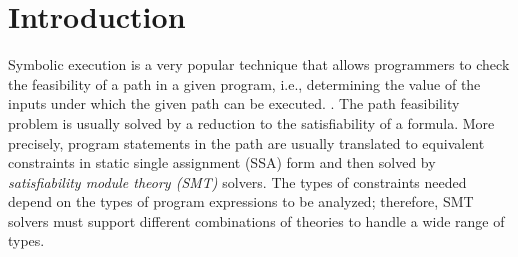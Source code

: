 \documentclass[sigplan,review,anonymous]{acmart}\settopmatter{printfolios=true,printccs=false,printacmref=false}
\begin{document}
\newcommand{\st}[2]{q_{#1}^{#2}}
\newcommand{\sym}[2]{v_{#1}^{#2}}

\maketitle






\section{Introduction} \label{section:introduction}

Symbolic execution is a very popular technique that allows programmers to check the feasibility of a path in a given program, i.e., determining the value of the inputs under which the given path can be executed. \cite{????}.
The path feasibility problem is usually solved by a reduction to the satisfiability of a formula. More precisely, program statements in the path are usually translated to equivalent constraints in static single assignment (SSA) form and then solved by \emph{satisfiability module theory (SMT)} solvers. The types of constraints needed depend on the types of program expressions to be analyzed; therefore, SMT solvers must support different combinations of theories to handle a wide range of types.
\end{document}
